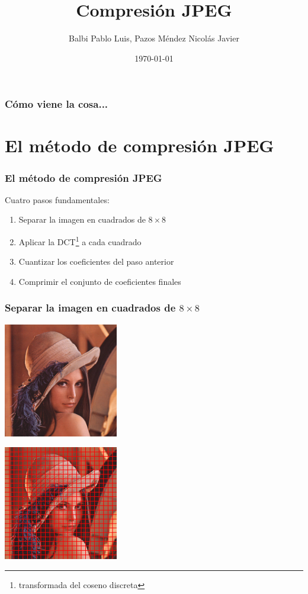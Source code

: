 \documentclass{beamer}
\begin{document}
\title{Compresión JPEG}
\author{Balbi Pablo Luis, Pazos Méndez Nicolás Javier}
\date{\today}

\begin{frame}
    \titlepage
\end{frame}

\begin{frame}
    \frametitle{Cómo viene la cosa...}
    \tableofcontents[hideallsubsections]
\end{frame}

\section{El método de compresión JPEG}
\begin{frame}
    \frametitle{El método de compresión JPEG}
        Cuatro pasos fundamentales:
        \begin{enumerate}
            \item Separar la imagen en cuadrados de $8 \times 8$
            \item Aplicar la DCT\footnote{transformada del coseno discreta} a cada cuadrado
            \item Cuantizar los coeficientes del paso anterior
            \item Comprimir el conjunto de coeficientes finales
        \end{enumerate}

\end{frame}

\begin{frame}
    \frametitle{Separar la imagen en cuadrados de $8 \times 8$}
    \begin{minipage}[t]{0.48\linewidth}
        \includegraphics[width=5cm, height=5cm]{fig/lena.png}
    \end{minipage}
    \hfill
    \begin{minipage}[t]{0.48\linewidth}
        \includegraphics[width=5cm, height=5cm]{fig/lena_blocks.png}
    \end{minipage}
\end{frame}
\end{document}
